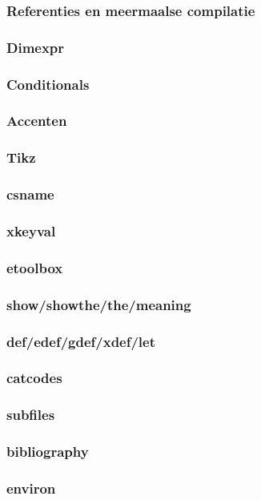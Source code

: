 \documentclass{cursuspresentatie}
\begin{document}
    \begin{frame}
        \frametitle{Referenties en meermaalse compilatie}
    \end{frame}

    \begin{frame}
        \frametitle{Dimexpr}
    \end{frame}

    \begin{frame}
        \frametitle{Conditionals}
    \end{frame}

    \begin{frame}
        \frametitle{Accenten}
    \end{frame}

    \begin{frame}
        \frametitle{Tikz}
    \end{frame}

    \begin{frame}
        \frametitle{csname}
    \end{frame}

    \begin{frame}
        \frametitle{xkeyval}
    \end{frame}

    \begin{frame}
        \frametitle{etoolbox}
    \end{frame}

    \begin{frame}
        \frametitle{show/showthe/the/meaning}
    \end{frame}

    \begin{frame}
        \frametitle{def/edef/gdef/xdef/let}
    \end{frame}

    \begin{frame}
        \frametitle{catcodes}
    \end{frame}

    \begin{frame}
        \frametitle{subfiles}
    \end{frame}

    \begin{frame}
        \frametitle{bibliography}
    \end{frame}

    \begin{frame}
        \frametitle{environ}
    \end{frame}
\end{document}
